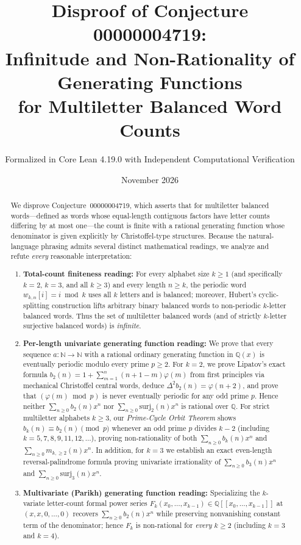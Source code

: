\documentclass[11pt,a4paper]{article}
\title{\textbf{Disproof of Conjecture 00000004719:\\
Infinitude and Non-Rationality of Generating Functions\\
for Multiletter Balanced Word Counts}}
\author{Formalized in Core Lean 4.19.0 with Independent Computational Verification}
\date{November 2026}
\theoremstyle{definition}
\newcommand{\N}{\mathbb{N}}
\newcommand{\Q}{\mathbb{Q}}
\newcommand{\surj}{\mathrm{surj}}
\begin{document}
\maketitle

\begin{abstract}
We disprove Conjecture~00000004719, which asserts that for multiletter balanced words---defined as words whose equal-length contiguous factors have letter counts differing by at most one---the count is finite with a rational generating function whose denominator is given explicitly by Christoffel-type structures. Because the natural-language phrasing admits several distinct mathematical readings, we analyze and refute \emph{every} reasonable interpretation:
\begin{enumerate}
  \item \textbf{Total-count finiteness reading:} For every alphabet size $k \ge 1$ (and specifically $k = 2$, $k = 3$, and all $k \ge 3$) and every length $n \ge k$, the periodic word $w_{k,n}[i] = i \bmod k$ uses all $k$ letters and is balanced; moreover, Hubert's cyclic-splitting construction lifts arbitrary binary balanced words to non-periodic $k$-letter balanced words. Thus the set of multiletter balanced words (and of strictly $k$-letter surjective balanced words) is \emph{infinite}.
  \item \textbf{Per-length univariate generating function reading:} We prove that every sequence $a : \N \to \N$ with a rational ordinary generating function in $\Q(x)$ is eventually periodic modulo every prime $p \ge 2$. For $k = 2$, we prove Lipatov's exact formula $b_2(n) = 1 + \sum_{m=1}^n (n + 1 - m)\varphi(m)$ from first principles via mechanical Christoffel central words, deduce $\Delta^2 b_2(n) = \varphi(n + 2)$, and prove that $(\varphi(m) \bmod p)$ is never eventually periodic for any odd prime $p$. Hence neither $\sum_{n \ge 0} b_2(n)x^n$ nor $\sum_{n \ge 0} \surj_2(n)x^n$ is rational over $\Q$. For strict multiletter alphabets $k \ge 3$, our \emph{Prime-Cycle Orbit Theorem} shows $b_k(n) \equiv b_2(n) \pmod p$ whenever an odd prime $p$ divides $k - 2$ (including $k = 5, 7, 8, 9, 11, 12, \dots$), proving non-rationality of both $\sum_{n \ge 0} b_k(n)x^n$ and $\sum_{n \ge 0} m_{k,\ge 2}(n)x^n$. In addition, for $k = 3$ we establish an exact even-length reversal-palindrome formula proving univariate irrationality of $\sum_{n \ge 0} b_3(n)x^n$ and $\sum_{n \ge 0} \surj_3(n)x^n$.
  \item \textbf{Multivariate (Parikh) generating function reading:} Specializing the $k$-variate letter-count formal power series $F_k(x_0,\dots,x_{k-1}) \in \Q[[x_0,\dots,x_{k-1}]]$ at $(x,x,0,\dots,0)$ recovers $\sum_{n \ge 0} b_2(n)x^n$ while preserving nonvanishing constant term of the denominator; hence $F_k$ is non-rational for \emph{every} $k \ge 2$ (including $k = 3$ and $k = 4$).

\end{enumerate}
\end{abstract}
\end{document}
